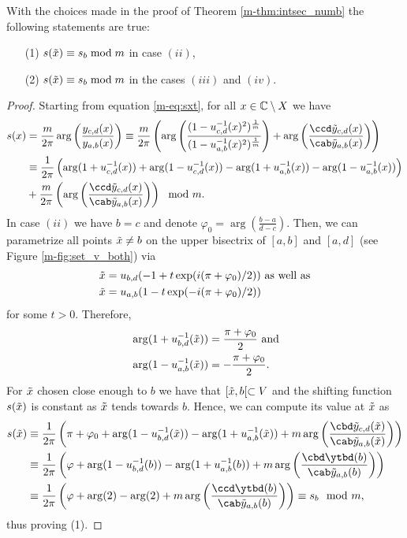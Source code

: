 \documentclass[main.tex]{subfiles}
\begin{document}
\begin{lemma}\label{lemma:sxt=sx}
  With the choices made in the proof of Theorem \ref{m-thm:intsec_numb} the following statements are true:
  \begin{itemize}
   \item[(1)] $s(\tilde{x}) \equiv s_b \bmod m$ in case $(ii)$,
    \item[(2)]  $s(\tilde{x}) \equiv s_b \bmod m$ in the cases $(iii)$ and $(iv)$.
  \end{itemize}
\end{lemma}
 \begin{proof}
 Starting from equation \eqref{m-eq:sxt}, for all $x \in \mathbb{C} \setminus X$ we have
   \begin{align*}
   s(x) & = \frac{m}{2\pi} \arg \left( \frac{\ycd(x)}{\yab(x)} \right)
   \equiv \frac{m}{2\pi} \left( \arg \left( \frac{(1- \ucd^{-1}(x)^2)\mr}{(1-\uab^{-1}(x)^2)\mr} \right) + \arg \left( \frac{ \ccd \ytcd(x)}{\cab
   \ytab(x)} \right) \right) \\
   & \equiv \frac{1}{2\pi} \left( \arg(1+\ucd^{-1}(x)) + \arg(1-\ucd^{-1}(x)) - \arg(1+\uab^{-1}(x)) - \arg(1-\uab^{-1}(x)) \right) \\
   & +  \frac{m}{2\pi} \left( \arg \left( \frac{ \ccd \ytcd(x)}{\cab\ytab(x)} \right)\right) \mod m.
  \end{align*}
 In case $(ii)$ we have $b = c$ and denote $\varphi_0 = \arg \left( \frac{b-a}{d-c} \right)$. Then, we can parametrize all points $\tilde{x} \ne b$ on 
 the upper bisectrix of $[a,b]$ and
 $[a,d]$ (see Figure \ref{m-fig:set_v_both}) via
 \begin{align*}
  \tilde{x} & = u_{b,d}(-1+t \exp(i(\pi+\varphi_0)/2)) \text{  as well as} \\
  \tilde{x} & = u_{a,b}(1-t \exp(-i (\pi+\varphi_0)/2))
 \end{align*}
 for some $t > 0$. Therefore,
 \begin{align*}
   & \arg (1+u_{b,d}^{-1}(\tilde{x})) = \frac{\pi+\varphi_0}{2} \text{ and} \\
   & \arg (1-u_{a,b}^{-1}(\tilde{x})) = -\frac{\pi+\varphi_0}{2}.
 \end{align*}
 For $\tilde{x}$ chosen close enough to $b$ we have that $[\tilde{x},b[ \subset V$ and the shifting function $s(\tilde{x})$ is constant as $\tilde{x}$ tends towards $b$. Hence, 
 we can compute its value at $\tilde{x}$ as
 \begin{align*}
  s(\xt) & \equiv \frac{1}{2\pi} \left( \pi + \varphi_0 + \arg(1-\ubd^{-1}(\xt)) - \arg(1+\uab^{-1}(\xt)) +  m \arg \left( \frac{ \cbd \ytcd(\xt)}{\cab\ytab(\xt)} \right)\right) \\
	 & \equiv \frac{1}{2\pi} \left ( \varphi +\arg(1-\ubd^{-1}(b)) - \arg(1+\uab^{-1}(b)) +  m \arg \left( \frac{ \cbd \ytbd(b)}{\cab\ytab(b)} \right)\right) \\
	 & \equiv \frac{1}{2\pi} \left( \varphi +\arg(2) - \arg(2) +  m \arg \left( \frac{ \ccd \ytbd(b)}{\cab\ytab(b)} \right)\right) \equiv s_b \mod m,
 \end{align*}
thus proving (1).


\end{proof}
\end{document}
